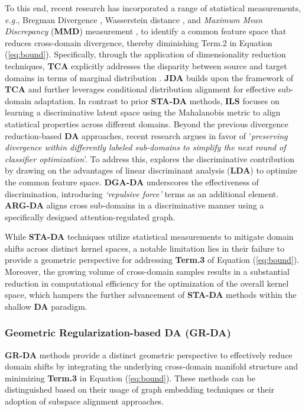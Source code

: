 To this end, recent research has incorporated a range of statistical measurements, \textit{e.g.}, Bregman Divergence \cite{4967588}, Wasserstein distance \cite{courty2017joint, courty2017optimal}, and \textit{Maximum Mean Discrepancy} (\textbf{MMD}) measurement \cite{pan2011domain}, to identify a common feature space that reduces cross-domain divergence, thereby diminishing Term.2 in Equation (\ref{eq:bound}). Specifically, through the application of dimensionality reduction techniques, \textbf{TCA} \cite{pan2011domain} explicitly addresses the disparity between source and target domains in terms of marginal distribution \cite{4967588} \cite{pan2011domain}. \textbf{JDA} \cite{long2013transfer} builds upon the framework of \textbf{TCA} and further leverages conditional distribution alignment for effective sub-domain adaptation. In contrast to prior \textbf{STA-DA} methods, \textbf{ILS} \cite{herath2017learning} focuses on learning a discriminative latent space using the Mahalanobis metric to align statistical properties across different domains. Beyond the previous divergence reduction-based \textbf{DA} approaches, recent research argues in favor of '\textit{preserving divergence within differently labeled sub-domains to simplify the next round of classifier optimization}'. To address this, \cite{lu2018embarrassingly} explores the discriminative contribution by drawing on the advantages of linear discriminant analysis (\textbf{LDA}) to optimize the common feature space. \textbf{DGA-DA} \cite{luo2020discriminative} underscores the effectiveness of discrimination, introducing \textit{‘repulsive force’} terms as an additional element. \textbf{ARG-DA} \cite{luo2022attention} aligns cross sub-domains in a discriminative manner using a specifically designed attention-regulated graph.





While \textbf{STA-DA} techniques utilize statistical measurements to mitigate domain shifts across distinct kernel spaces, a notable limitation lies in their failure to provide a geometric perspective for addressing \textbf{Term.3} of Equation (\ref{eq:bound}). Moreover, the growing volume of cross-domain samples results in a substantial reduction in computational efficiency for the optimization of the overall kernel space, which hampers the further advancement of \textbf{STA-DA} methods within the shallow \textbf{DA} paradigm.





\subsubsection{Geometric Regularization-based DA \textbf{(GR-DA)}} 
\label{Geometric alignment-based DA}
\textbf{GR-DA} methods provide a distinct geometric perspective to effectively reduce domain shifts by integrating the underlying cross-domain manifold structure and minimizing \textbf{Term.3} in Equation (\ref{eq:bound}). These methods can be distinguished based on their usage of graph embedding techniques or their adoption of subspace alignment approaches.





